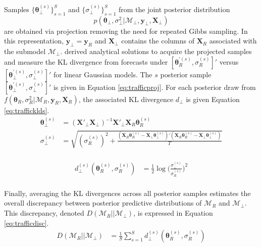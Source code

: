 Samples $\{\bm{\theta}^{(s)}_\perp\}_{s=1}^S$ and $\{\sigma^{(s)}_\perp\}_{s=1}^S$ from the joint posterior distribution $$p(\bm{\theta}_\perp,\sigma^2_\perp|\mathcal{M}_\perp,\bm{y}_\perp,\bm{X}_\perp)$$ are obtained via projection removing the need for repeated Gibbs sampling. In this representation, $\bm{y}_\perp=\bm{y}_R$ and $\bm{X}_\perp$ contains the columns of $\bm{X}_R$ associated with the submodel $\mathcal{M}_\perp$. \cite{Piironen2017} derived analytical solutions to acquire the projected samples and measure the KL divergence from forecasts under $[\bm{\theta}^{'(s)}_R,\sigma^{(s)}_R]'$ versus $[\bm{\theta}^{'(s)}_\perp,\sigma^{(s)}_\perp]'$ for linear Gaussian models. The $s$ posterior sample  $[\bm{\theta}^{'(s)}_\perp,\sigma^{(s)}_\perp]'$ is given in Equation \ref{eq:trafficproj}. For each posterior draw from $f(\bm{\theta}_R,\sigma^2_R|\mathcal{M}_{R},\bm{y}_R,\bm{X}_R)$, the associated KL divergence $d_{\perp}$ is given Equation \ref{eq:trafficklds}. 
\begin{equation}
\label{eq:trafficproj}
\begin{split}
\bm{\theta}^{(s)}_\perp&=(\bm{X}'_\perp\bm{X}_\perp)^{-1} \bm{X}'_\perp \bm{X}_R\bm{\theta}^{(s)}_R\\
\sigma^{(s)}_\perp&=\sqrt{(\sigma^{(s)}_R)^2+\frac{(\bm{X}_R\bm{\theta}^{(s)}_R-\bm{X}_\perp\bm{\theta}^{(s)}_\perp)'(\bm{X}_R\bm{\theta}^{(s)}_R-\bm{X}_\perp\bm{\theta}^{(s)}_\perp)}{T}                                  }\\
\end{split}
\end{equation}

\begin{equation}
\label{eq:trafficklds}
\begin{split}
d^{(s)}_{\perp}(\bm{\theta}^{(s)}_R,\sigma^{(s)}_R)&=\frac{1}{2}\log\bigg(\frac{\sigma^{(s)}_\perp}{\sigma^{(s)}_R}\bigg)^2\\
\end{split}
\end{equation}

Finally, averaging the KL divergences across all posterior samples estimates the overall discrepancy between posterior predictive distributions of $\mathcal{M}_R$ and $\mathcal{M}_\perp$. This discrepancy, denoted $D(\mathcal{M}_{R}||\mathcal{M}_\perp)$, is expressed in Equation \ref{eq:trafficdisc}. 
\begin{equation}
\label{eq:trafficdisc}
\begin{split}
D(\mathcal{M}_{R}||\mathcal{M}_\perp)&=\frac{1}{S}\sum\limits^S_{s=1} d^{(s)}_{\perp}(\bm{\theta}^{(s)}_R,\sigma^{(s)}_R)   \\
\end{split}
\end{equation}


